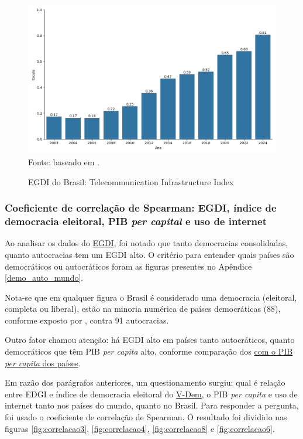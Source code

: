 \begin{figure}[H]
	\centering
	\caption{EGDI do Brasil: Telecommunication Infrastructure Index}
	\includegraphics[width=1\linewidth]{figuras/egdi/egdi_brasil_tsi.png}
	\label{fig:egdi_brasil_tsi}
	\footnotesize{Fonte: baseado em \cite{ONU_edgi_mapa}.}
\end{figure}

\subsubsection{Coeficiente de correlação de Spearman: EGDI, índice de democracia eleitoral, PIB \textit{per capital} e uso de internet}

Ao analisar os dados do \href{https://publicadministration.un.org/egovkb/en-us/About/Overview/-E-Government-Development-Index}{EGDI}, foi notado que tanto democracias consolidadas, quanto autocracias tem um EGDI alto. O critério para entender quais países são democráticos ou autocráticos foram as figuras presentes no Apêndice \ref{demo_auto_mundo}. 

Nota-se que em qualquer figura o Brasil é considerado uma democracia (eleitoral, completa ou liberal), estão na minoria numérica de países democráticas (88), conforme exposto por \cite{nord2025democracy}, contra 91 autocracias.

Outro fator chamou atenção: há EGDI alto em países tanto autocráticos, quanto democráticos que têm PIB \textit{per capita} alto, conforme comparação dos \href{https://data.worldbank.org/indicator/NY.GDP.PCAP.PP.KD}{com o PIB \textit{per capita} dos países}. 

Em razão dos parágrafos anteriores, um questionamento surgiu: qual é relação entre EDGI e índice de democracia eleitoral do \href{https://www.v-dem.net/}{V-Dem}, o PIB \textit{per capita} e uso de internet tanto nos países do mundo, quanto no Brasil. Para responder a pergunta, foi usado o coeficiente de correlação de Spearman. O resultado foi dividido nas figuras \ref{fig:correlacao3}, \ref{fig:correlacao4}, \ref{fig:correlacao8} e \ref{fig:correlacao6}.

